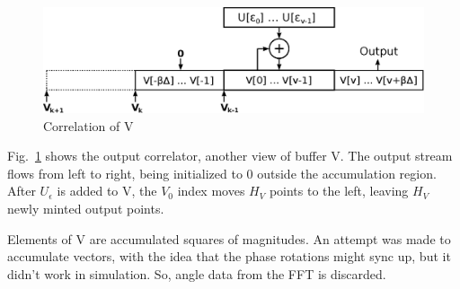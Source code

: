 \begin{figure}
	\centering
	\includegraphics[width=0.99\linewidth]{../source/wbuf_e}
	\caption[W correlation]{Correlation of V}
	\label{fig:wbuf}
\end{figure}

Fig.~\ref{fig:wbuf} shows the output correlator, another view of buffer V.
The output stream flows from left to right,
being initialized to 0 outside the accumulation region.
After $U_\epsilon$ is added to V, the $V_0$ index moves $H_V$ points
to the left, leaving $H_V$ newly minted output points.

Elements of V are accumulated squares of magnitudes.
An attempt was made to accumulate vectors,
with the idea that the phase rotations might sync up,
but it didn't work in simulation.
So, angle data from the FFT is discarded.
